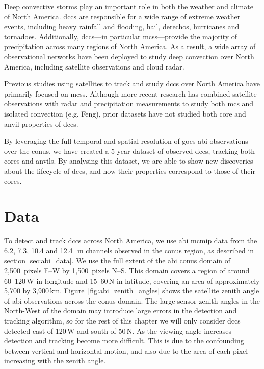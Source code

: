 Deep convective storms play an important role in both the weather and climate of North America.
\acrshort{dcc}s are responsible for a wide range of extreme weather events, including heavy rainfall and flooding, hail, derechos, hurricanes and tornadoes.
Additionally, \acrshort{dcc}s---in particular \acrshort{mcs}s---provide the majority of precipitation across many regions of North America.
As a result, a wide array of observational networks have been deployed to study deep convection over North America, including satellite observations and cloud radar.

Previous studies using satellites to track and study \acrshort{dcc}s over North America have primarily focused on \acrshort{mcs}s.
Although more recent research has combined satellite observations with radar and precipitation measurements to study both \acrshort{mcs} and isolated convection (e.g. Feng), prior datasets have not studied both core and anvil properties of \acrshort{dcc}s.

By leveraging the full temporal and spatial resolution of \acrshort{goes} \acrshort{abi} observations over the \acrshort{conus}, we have created a 5-year dataset of observed \acrshort{dcc}s, tracking both cores and anvils.
By analysing this dataset, we are able to show new discoveries about the lifecycle of \acrshort{dcc}s, and how their properties correspond to those of their cores.

\section{Data}

To detect and track \acrshort{dcc}s across North America, we use \acrshort{abi} \acrshort{mcmip} data from the 6.2, 7.3, 10.4 and 12.4\,\unit{\mu m} channels observed in the \acrshort{conus} region, as described in section \ref{sec:abi_data}.
We use the full extent of the \acrshort{abi} \acrshort{conus} domain of 2,500~pixels E--W by 1,500~pixels N--S.
This domain covers a region of around 60--120\,\textdegree W in longitude and 15--60\,\textdegree N in latitude, covering an area of approximately 5,700 by 3,900\,\unit{km}.
Figure~\ref{fig:abi_zenith_angles} shows the satellite zenith angle of \acrshort{abi} observations across the \acrshort{conus} domain.
The large sensor zenith angles in the North-West of the domain may introduce large errors in the detection and tracking algorithm, so for the rest of this chapter we will only consider \acrshort{dcc}s detected east of 120\,\textdegree W and south of 50\,\textdegree N.
As the viewing angle increases detection and tracking become more difficult.
This is due to the confounding between vertical and horizontal motion, and also due to the area of each pixel increasing with the zenith angle.

